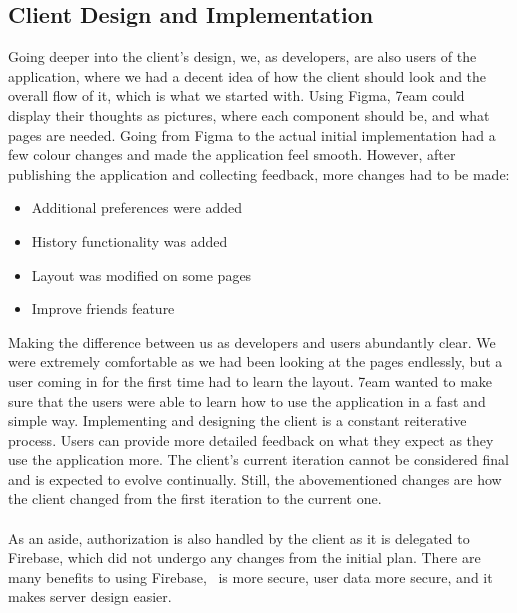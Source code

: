 \documentclass{article}
\begin{document}
\subsection{Client Design and Implementation}
Going deeper into the client's design, we, as developers, are also users of the application, where we had a decent idea of how the client should look and the overall flow of it, which is what we started with. Using Figma, 7eam could display their thoughts as pictures, where each component should be, and what pages are needed. Going from Figma to the actual initial implementation had a few colour changes and made the application feel smooth. However, after publishing the application and collecting feedback, more changes had to be made:
\begin{itemize}
	\item Additional preferences were added
	\item History functionality was added
	\item Layout was modified on some pages
	\item Improve friends feature
\end{itemize}
Making the difference between us as developers and users abundantly clear. We were extremely comfortable as we had been looking at the pages endlessly, but a user coming in for the first time had to learn the layout. 7eam wanted to make sure that the users were able to learn how to use the application in a fast and simple way. Implementing and designing the client is a constant reiterative process. Users can provide more detailed feedback on what they expect as they use the application more. The client's current iteration cannot be considered final and is expected to evolve continually. Still, the abovementioned changes are how the client changed from the first iteration to the current one.
\\~\\ As an aside, authorization is also handled by the client as it is delegated to Firebase, which did not undergo any changes from the initial plan. There are many benefits to using Firebase, \progname ~is more secure, user data more secure, and it makes server design easier.
\end{document}

